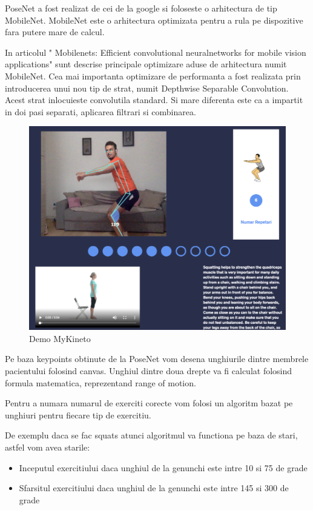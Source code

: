 PoseNet a fost realizat de cei de la google si foloseste o arhitectura de tip MobileNet.
MobileNet este o arhitectura optimizata pentru a rula pe dispozitive fara putere mare de calcul.
 
In articolul " Mobilenets:  Efficient  convolutional  neuralnetworks for mobile vision applications"  \cite{DBLP:journals/corr/HowardZCKWWAA17} sunt descrise principale optimizare aduse de arhitectura numit MobileNet.
Cea mai importanta optimizare de performanta a fost realizata prin introducerea unui nou tip de strat, numit Depthwise Separable Convolution. Acest strat inlocuieste convolutila standard. Si mare diferenta este ca a impartit in doi pasi separati, aplicarea filtrari si combinarea.


 \begin{figure}[htbp]
	\centerline{\includegraphics[scale=0.7]{fig/demo-mykineto.png}}  
	\caption{Demo MyKineto}
	\label{fig:demo-web-mykineto}
\end{figure}
 


Pe baza keypoints obtinute de la PoseNet vom desena unghiurile dintre membrele pacientului folosind canvas.
Unghiul dintre doua drepte va fi calculat folosind formula matematica, reprezentand range of motion.


Pentru a numara numarul de exerciti corecte vom folosi un algoritm bazat pe unghiuri pentru fiecare tip de exercitiu.

De exemplu daca se fac squats atunci algoritmul va functiona pe baza de stari, astfel vom avea starile:
\begin{itemize}
    \item Inceputul exercitiului daca unghiul de la genunchi este intre 10 si 75 de grade
    \item Sfarsitul exercitiului daca unghiul de la genunchi este intre 145 si 300 de grade
\end{itemize}

